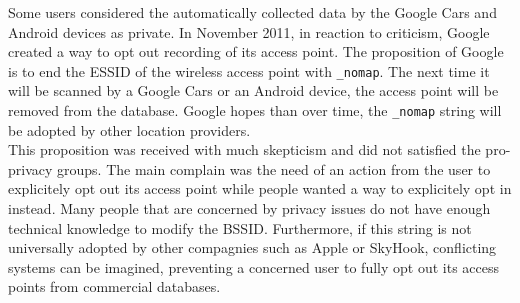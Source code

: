 Some users considered the automatically collected data by the Google Cars and Android devices as private. In November 2011, in reaction to criticism, Google created a way to opt out recording of its access point. The proposition of Google is to end the ESSID of the wireless access point with \texttt{\_nomap}. The next time it will be scanned by a Google Cars or an Android device, the access point will be removed from the database. Google hopes than over time, the \texttt{\_nomap} string will be adopted by other location providers.\cite{nomap}\\

This proposition was received with much skepticism and did not satisfied the pro-privacy groups.
The main complain was the need of an action from the user to explicitely opt out its access point while people wanted a way to explicitely opt in instead.
Many people that are concerned by privacy issues do not have enough technical knowledge to modify the BSSID.
Furthermore, if this string is not universally adopted by other compagnies such as Apple or SkyHook, conflicting systems can be imagined, preventing a concerned user to fully opt out its access points from commercial databases.